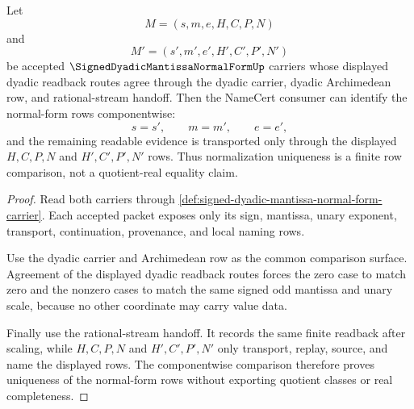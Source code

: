 \begin{theorem}
\label{thm:signed-dyadic-mantissa-normal-form-normalization-uniqueness}
Let
$$
M=(s,m,e,H,C,P,N)
$$
and
$$
M'=(s',m',e',H',C',P',N')
$$
be accepted $\SignedDyadicMantissaNormalFormUp$ carriers whose displayed dyadic readback routes agree through the dyadic carrier, dyadic Archimedean row, and rational-stream handoff. Then the NameCert consumer can identify the normal-form rows componentwise:
$$
s=s',\qquad m=m',\qquad e=e',
$$
and the remaining readable evidence is transported only through the displayed $H,C,P,N$ and $H',C',P',N'$ rows. Thus normalization uniqueness is a finite row comparison, not a quotient-real equality claim.
\end{theorem}
\begin{proof}
Read both carriers through \autoref{def:signed-dyadic-mantissa-normal-form-carrier}. Each accepted packet exposes only its sign, mantissa, unary exponent, transport, continuation, provenance, and local naming rows.

Use the dyadic carrier and Archimedean row as the common comparison surface. Agreement of the displayed dyadic readback routes forces the zero case to match zero and the nonzero cases to match the same signed odd mantissa and unary scale, because no other coordinate may carry value data.

Finally use the rational-stream handoff. It records the same finite readback after scaling, while $H,C,P,N$ and $H',C',P',N'$ only transport, replay, source, and name the displayed rows. The componentwise comparison therefore proves uniqueness of the normal-form rows without exporting quotient classes or real completeness.
\end{proof}


\begin{closurestatus}{\SignedDyadicMantissaNormalFormUp}
  \theoryclosure{\seedClosure}
  \formalstatus{\unformalizedV}
\end{closurestatus}

